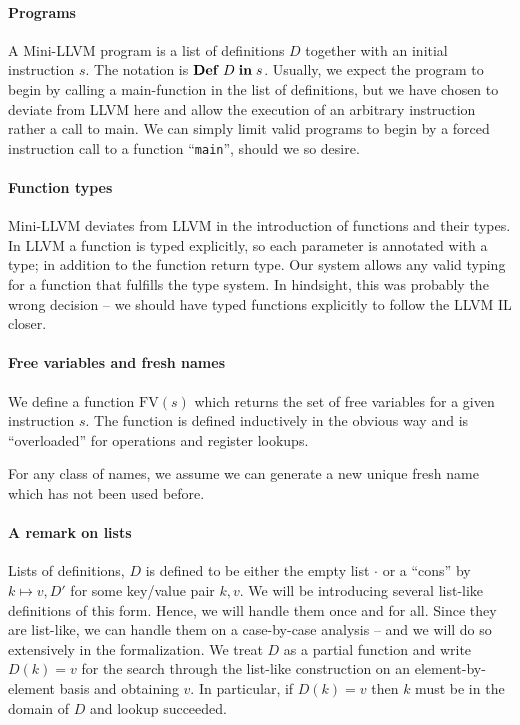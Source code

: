 \documentclass[a4paper, oneside, 10pt, draft]{memoir}
\begin{document}
\paragraph{Programs}

A Mini-LLVM program is a list of definitions $D$ together with an
initial instruction $s$. The notation is $\mathbf{Def} \; D \; \mathbf{in} \; s$. Usually, we
expect the program to begin by calling a main-function in the list of
definitions, but we have chosen to deviate from LLVM here and allow
the execution of an arbitrary instruction rather a call to main. We
can simply limit valid programs to begin by a forced instruction
call to a function ``\texttt{main}'', should we so desire.

\paragraph{Function types}

Mini-LLVM deviates from LLVM in the introduction of functions and
their types. In LLVM a function is typed explicitly, so each parameter
is annotated with a type; in addition to the function return type. Our
system allows any valid typing for a function that fulfills the type
system. In hindsight, this was probably the wrong decision -- we
should have typed functions explicitly to follow the LLVM IL closer.

\paragraph{Free variables and fresh names}
\newcommand{\fv}{\mathrm{FV}}
We define a function $\fv(s)$ which returns the set of free variables
for a given instruction $s$. The function is defined inductively in
the obvious way and is ``overloaded'' for operations and register
lookups.

For any class of names, we assume we can generate a new unique fresh
name which has not been used before.

\paragraph{A remark on lists}

Lists of definitions, $D$ is defined to be either the empty list
$\cdot$ or a ``cons'' by $k \mapsto v,D'$ for some key/value pair
$k,v$. We will be introducing several list-like definitions of this
form. Hence, we will handle them once and for all. Since they are
list-like, we can handle them on a case-by-case analysis -- and we
will do so extensively in the formalization. We treat $D$ as
a partial function and write $D(k) = v$ for the search through the
list-like construction on an element-by-element basis and obtaining
$v$. In particular, if $D(k) = v$ then $k$ must be in the domain of
$D$ and lookup succeeded.
\end{document}
